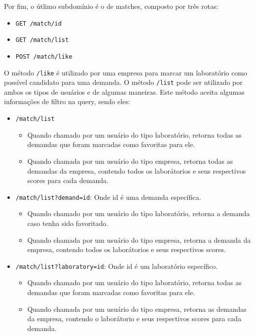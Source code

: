 Por fim, o útlimo subdomínio é o de matches, composto por três rotas:

\begin{itemize}
  \item \texttt{GET /match/{id}}
  \item \texttt{GET /match/list}
  \item \texttt{POST /match/like}
\end{itemize}

O método \texttt{/like} é utilizado por uma empresa para marcar um laboratório como possível candidato para uma demanda. O método \texttt{/list} pode ser utilizado por ambos os tipos de usuários e de algumas maneiras. Este método aceita algumas informações de filtro na query, sendo eles:

\begin{itemize}
  \item \texttt{/match/list}
        \begin{itemize}
          \item Quando chamado por um usuário do tipo laboratório, retorna todas as demandas que foram marcadas como favoritas para ele.
          \item Quando chamada por um usuário do tipo empresa, retorna todas as demandas da empresa, contendo todos os laborátorios e seus respectivos scores para cada demanda.
        \end{itemize}
  \item \texttt{/match/list?demand=id}: Onde id é uma demanda específica.
        \begin{itemize}
          \item Quando chamado por um usuário do tipo laboratório, retorna a demanda caso tenha sido favoritado.
          \item Quando chamada por um usuário do tipo empresa, retorna a demanda da empresa, contendo todos os laborátorios e seus respectivos scores.
        \end{itemize}
  \item \texttt{/match/list?laboratory=id}: Onde id é um laboratório específico.
        \begin{itemize}
          \item Quando chamado por um usuário do tipo laboratório, retorna todas as demandas que foram marcadas como favoritas para ele.
          \item Quando chamada por um usuário do tipo empresa, retorna as demandas da empresa, contendo o laborátorio e seus respectivos scores para cada demanda.

\end{itemize}
\end{itemize}
